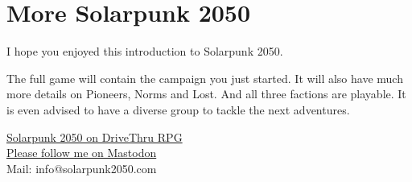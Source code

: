 \chapter{More Solarpunk 2050}

I hope you enjoyed this introduction to Solarpunk 2050.

The full game will contain the campaign you just started. It will also have much more details on Pioneers, Norms and Lost.
And all three factions are playable. It is even advised to have a diverse group to tackle the next adventures.

\vspace{1cm}
\begin{center}
\href{https://www.drivethrurpg.com/product/443881/Solarpunk-2050?affiliate_id=490747}{Solarpunk 2050 on DriveThru RPG} \\
\href{https://dice.camp/@solarpunk2050}{Please follow me on Mastodon} \\
Mail: info@solarpunk2050.com \\
\end{center}